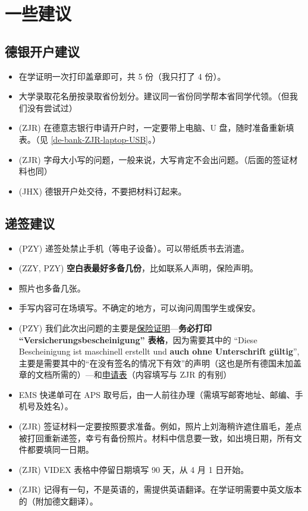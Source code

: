 \documentclass[oneside,final]{book}
\begin{document}
\chapter{一些建议}
\section{德银开户建议}
\begin{itemize}
  \item 在学证明一次打印盖章即可，共 5 份（我只打了 4 份）。
  \item 大学录取花名册按录取省份划分。建议同一省份同学帮本省同学代领。（但我们没有尝试过）
  \item (ZJR) 在德意志银行申请开户时，一定要带上电脑、U 盘，随时准备重新填表。（见 \ref{de-bank-ZJR-laptop-USB}。）
  \item (ZJR) 字母大小写的问题，一般来说，大写肯定不会出问题。（后面的签证材料也同）
  \item (JHX) 德银开户处交待，不要把材料订起来。
\end{itemize}

\section{递签建议}
\begin{itemize}
\item (PZY) 递签处禁止手机（等电子设备）。可以带纸质书去消遣。
\item (ZZY, PZY) \textbf{\color{blue}空白表最好多备几份}，比如联系人声明，保险声明。
\item\label{print-fee} 照片也多备几张。
\item 手写内容可在场填写。不确定的地方，可以询问周围学生或保安。
\item\label{ensurance-Versicherungsbescheinigung} (PZY) 我们此次出问题的主要是\underline{保险证明}---\textbf{\color{red}务必打印 ``Versicherungsbescheinigung'' 表格}，因为需要其中的 ``Diese Bescheinigung ist maschinell erstellt und \textbf{\color{red}auch ohne Unterschrift gültig}'', 主要是需要其中的“在没有签名的情况下有效”的声明（这也是所有德国未加盖章的文档所需的）---和\underline{申请表}（内容填写与 ZJR 的有别）%
\item EMS 快递单可在 APS 取号后，由一人前往办理（需填写邮寄地址、邮编、手机号及姓名）。
\item (ZJR) 签证材料一定要按照要求准备。例如，照片上刘海稍许遮住眉毛，差点被打回重新递签，幸亏有备份照片。材料中信息要一致，如出境日期，所有文件都要填同一日期。
\item (ZJR) VIDEX 表格中停留日期填写 90 天，从 4 月 1 日开始。
\item (ZJR) 记得有一句，不是英语的，需提供英语翻译。在学证明需要中英文版本的（附加德文翻译）。
\end{itemize}
%
\end{document}

